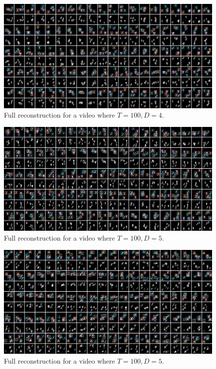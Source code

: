 \documentclass{article}
\theoremstyle{definition}
\begin{document}
\begin{figure}[h!]
\includegraphics[width=170mm]{figures/T=100-D=4.pdf}
\caption{Full reconstruction for a video where $T=100, D=4$.}
\end{figure}
\newpage
\begin{figure}[h!]
\includegraphics[width=170mm]{figures/T=100-D=5.pdf}
\caption{Full reconstruction for a video where $T=100, D=5$.}
\end{figure}

\begin{figure}[h!]
\includegraphics[width=170mm]{figures/T=100-D=5-2.pdf}
\caption{Full reconstruction for a video where $T=100, D=5$.}
\end{figure}
\end{document}
